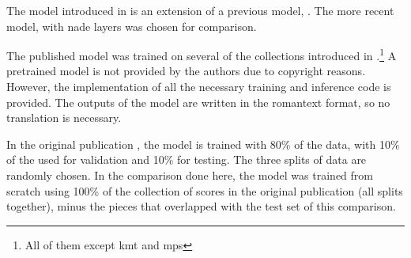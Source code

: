 
The model introduced in \textcite{micchi2021deep} is an
extension of a previous model, \textcite{micchi2020not}. The
more recent model, with \gls{nade} layers was chosen for
comparison.

The published model was trained on several of the
collections introduced in
.\footnote{All of
them except \gls{kmt} and \gls{mps}} A pretrained model is
not provided by the authors due to copyright reasons.
However, the implementation of all the necessary training
and inference code is provided. The outputs of the model are
written in the \gls{romantext} format, so no translation is
necessary. 

In the original publication \parencite{micchi2021deep}, the
model is trained with 80\% of the data, with 10\% of the
used for validation and 10\% for testing. The three splits
of data are randomly chosen. In the comparison done here,
the model was trained from scratch using 100\% of the
collection of scores in the original publication (all splits
together), minus the pieces that overlapped with the test
set of this comparison.
